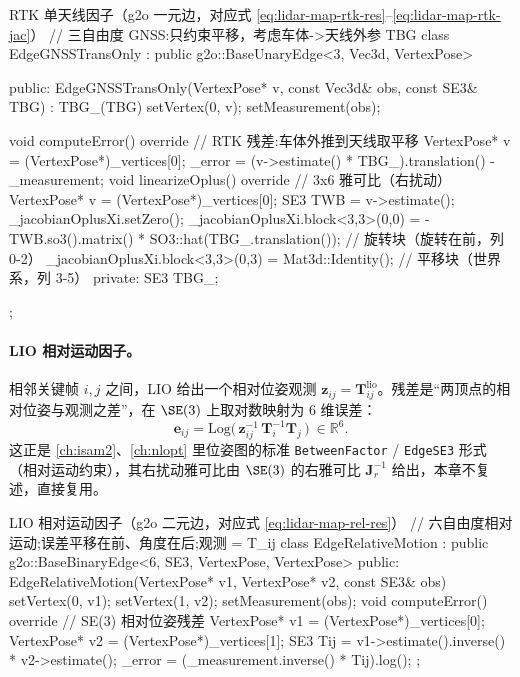 \begin{codebox}[C++]{RTK 单天线因子（g2o 一元边，对应式 \ref{eq:lidar-map-rtk-res}--\ref{eq:lidar-map-rtk-jac}）}
// 三自由度 GNSS:只约束平移，考虑车体->天线外参 TBG
class EdgeGNSSTransOnly : public g2o::BaseUnaryEdge<3, Vec3d, VertexPose> {
 public:
  EdgeGNSSTransOnly(VertexPose* v, const Vec3d& obs, const SE3& TBG)
      : TBG_(TBG) { setVertex(0, v); setMeasurement(obs); }

  void computeError() override {                       // RTK 残差:车体外推到天线取平移
    VertexPose* v = (VertexPose*)_vertices[0];
    _error = (v->estimate() * TBG_).translation() - _measurement;
  }
  void linearizeOplus() override {                     // 3x6 雅可比（右扰动）
    VertexPose* v = (VertexPose*)_vertices[0];
    SE3 TWB = v->estimate();
    _jacobianOplusXi.setZero();
    _jacobianOplusXi.block<3,3>(0,0) = -TWB.so3().matrix() * SO3::hat(TBG_.translation()); // 旋转块（旋转在前，列 0-2）
    _jacobianOplusXi.block<3,3>(0,3) = Mat3d::Identity();                       // 平移块（世界系，列 3-5）
  }
 private:
  SE3 TBG_;
};
\end{codebox}

\paragraph{LIO 相对运动因子。}
相邻关键帧 $i,j$ 之间，LIO 给出一个相对位姿观测 $\mathbf{z}_{ij}=\mathbf{T}_{ij}^{\text{lio}}$。残差是“两顶点的相对位姿与观测之差”，在 $\SE(3)$ 上取对数映射为 $6$ 维误差\cite{gao2023slamad}：
\begin{equation}
\label{eq:lidar-map-rel-res}
\mathbf{e}_{ij}=\mathrm{Log}\!\Big(\,\mathbf{z}_{ij}^{-1}\,\mathbf{T}_i^{-1}\mathbf{T}_j\,\Big)\ \in\mathbb{R}^6 .
\end{equation}
这正是 \cref{ch:isam2}、\cref{ch:nlopt} 里位姿图的标准 \texttt{BetweenFactor} / \texttt{EdgeSE3} 形式（相对运动约束），其右扰动雅可比由 $\SE(3)$ 的右雅可比 $\mathbf{J}_r^{-1}$ 给出，本章不复述，直接复用。

\begin{codebox}[C++]{LIO 相对运动因子（g2o 二元边，对应式 \ref{eq:lidar-map-rel-res}）}
// 六自由度相对运动;误差平移在前、角度在后;观测 = T_ij
class EdgeRelativeMotion : public g2o::BaseBinaryEdge<6, SE3, VertexPose, VertexPose> {
 public:
  EdgeRelativeMotion(VertexPose* v1, VertexPose* v2, const SE3& obs) {
    setVertex(0, v1); setVertex(1, v2); setMeasurement(obs);
  }
  void computeError() override {                       // SE(3) 相对位姿残差
    VertexPose* v1 = (VertexPose*)_vertices[0];
    VertexPose* v2 = (VertexPose*)_vertices[1];
    SE3 Tij = v1->estimate().inverse() * v2->estimate();
    _error = (_measurement.inverse() * Tij).log();
  }
};
\end{codebox}

